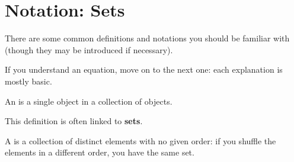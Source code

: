 \section{Notation: Sets}

    There are some common definitions and notations you should be familiar with (though they may be introduced if necessary).
    
    If you understand an equation, move on to the next one: each explanation is mostly basic.\\
    
    \begin{definition}
        An  is a single object in a collection of objects.
    \end{definition}
    
    This definition is often linked to \textbf{sets}.\\
    
    \begin{definition}
        A  is a collection of distinct elements with no given order: if you shuffle the elements in a different order, you have the same set.
    \end{definition}
    
